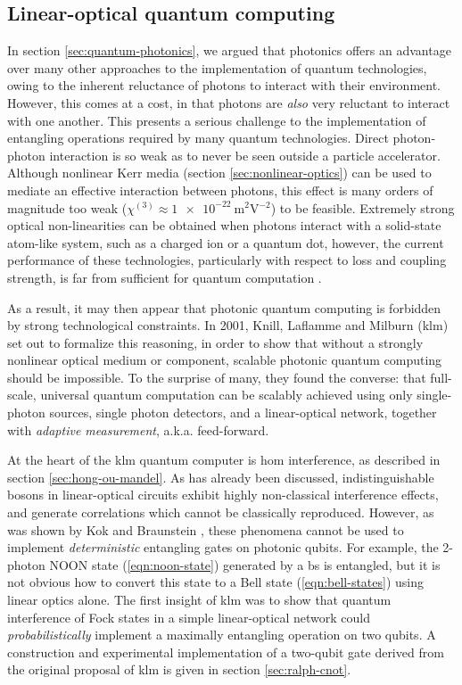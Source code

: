 \subsection{Linear-optical quantum computing} 
\label{sec:klm}
In section \ref{sec:quantum-photonics}, we argued that photonics offers an advantage over many other approaches to the implementation of quantum technologies, owing to the inherent reluctance of photons to interact with their environment. However, this comes at a cost, in that photons are \emph{also} very reluctant to interact with one another. This presents a serious challenge to the implementation of entangling operations required by many quantum technologies.  Direct photon-photon interaction is so weak as to never be seen outside a particle accelerator. Although nonlinear Kerr media (section \ref{sec:nonlinear-optics}) can be used to mediate an effective interaction between photons, this effect is many orders of magnitude too weak ($\chi^{(3)} \approx \SI{1e-22}{\metre^2 \volt^{-2}}$) to be feasible. Extremely strong optical non-linearities can be obtained when photons interact with a solid-state atom-like system, such as a charged ion or a quantum dot, however, the current performance  of these technologies, particularly with respect to loss and coupling strength, is far from sufficient for quantum computation \cite{Kok2005, Devitt2007}.

As a result, it may then appear that photonic quantum computing is forbidden by strong technological constraints. 
In 2001, Knill, Laflamme and Milburn (\acrshort{klm}) set out to formalize this reasoning, in order to show that without a strongly nonlinear optical medium or component, scalable photonic quantum computing should be impossible. 
To the surprise of many, they found \cite{Knill2001} the converse: that full-scale, universal quantum computation can be scalably achieved using only single-photon sources, single photon detectors, and a linear-optical network, together with \emph{adaptive measurement}, a.k.a. feed-forward.

At the heart of the \gls{klm} quantum computer is \gls{hom} interference, as described in section \ref{sec:hong-ou-mandel}. As has already been discussed, indistinguishable bosons in linear-optical circuits exhibit highly non-classical interference effects, and generate correlations which cannot be classically reproduced. However, as was shown by Kok and Braunstein \cite{Kok2000}, these phenomena cannot be used to implement \emph{deterministic} entangling gates on photonic qubits. For example, the 2-photon NOON state (\ref{eqn:noon-state}) generated by a \gls{bs} is entangled, but it is not obvious how to convert this state to a Bell state (\ref{eqn:bell-states}) using linear optics alone.
The first insight of \gls{klm} was to show that quantum interference of Fock states in a simple linear-optical network could \emph{probabilistically} implement a maximally entangling operation on two qubits. A construction and experimental implementation of a two-qubit gate derived from the original proposal of \gls{klm} is given in section \ref{sec:ralph-cnot}. 

